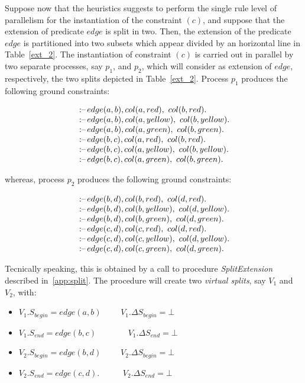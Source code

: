 \documentclass[preprint]{tlp}
\newcommand{\DNF}{\ensuremath{\Delta S}\xspace}
\newcommand{\derives}{\ensuremath{\mbox{\,$:$--}\,}\xspace}
\newenvironment{dlvcode}
  {\begin{displaymath}\begin{array}{l}}
  {\end{array}\end{displaymath}}
\begin{document}
\noindent Suppose now that the heuristics suggests to perform the single rule level of parallelism
for the instantiation of the constraint $(c)$, and suppose that the extension of predicate $edge$ is split in two.
Then, the extension of the predicate $edge$ is partitioned into two subsets which appear divided by an horizontal line in Table~\ref{ext_2}.
The instantiation of constraint $(c)$ is carried out in parallel by two separate processes, 
say $p_1$, and $p_2$, which will consider as extension of $edge$, respectively, the two splits depicted in Table~\ref{ext_2}.
Process $p_1$ produces the following ground constraints:
\begin{small}
\begin{dlvcode}
\derives edge(a,b), col(a,red),\ col(b,red). \\ 
\derives edge(a,b), col(a,yellow),\ col(b,yellow). \\ 
\derives edge(a,b), col(a,green),\ col(b,green). \\ 
\derives edge(b,c), col(a,red),\ col(b,red). \\
\derives edge(b,c), col(a,yellow),\ col(b,yellow). \\
\derives edge(b,c), col(a,green),\ col(b,green). 
\end{dlvcode}
\end{small}
\noindent whereas, process $p_2$ produces the following ground constraints:
\begin{small}
\begin{dlvcode}
\derives edge(b,d), col(b,red),\ col(d,red). \\ 
\derives edge(b,d), col(b,yellow),\ col(d,yellow). \\ 
\derives edge(b,d), col(b,green),\ col(d,green). \\ 
\derives edge(c,d), col(c,red),\ col(d,red). \\
\derives edge(c,d), col(c,yellow),\ col(d,yellow). \\
\derives edge(c,d), col(c,green),\ col(d,green). 
\end{dlvcode}
\end{small}

Tecnically speaking, this is obtained by a call to procedure {\em SplitExtension \/} described in~\ref{app:split}.
The procedure will create two {\em virtual splits}, say $V_1$ and $V_2$, with:
\begin{itemize}
\item[] $V_1.S_{begin} = edge(a,b)$ \ \ \ \ $V_1.\DNF_{begin} = \bot$
\item[] $V_1.S_{end} = edge(b,c)$  \ \ \ \ \ \ \ $V_1.\DNF_{end} = \bot $
\item[]$V_2.S_{begin} = edge(b,d)$ \ \ \ \ $V_2.\DNF_{begin} = \bot$
\item[] $V_2.S_{end} = edge(c,d)$. \ \ \ \ \ $V_2.\DNF_{end} = \bot$
\end{itemize}
\end{document}
